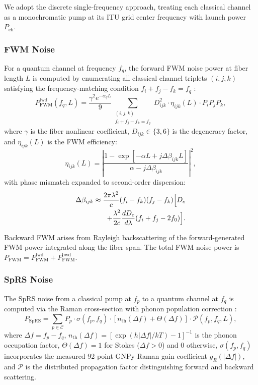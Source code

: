 \documentclass[conference]{IEEEtran}
\begin{document}
We adopt the discrete single-frequency approach, treating each classical channel as a monochromatic pump at its ITU grid center frequency with launch power $P_{\text{ch}}$.

\subsubsection{FWM Noise}

For a quantum channel at frequency $f_q$, the forward FWM noise power at fiber length $L$ is computed by enumerating all classical channel triplets $(i, j, k)$ satisfying the frequency-matching condition $f_i + f_j - f_k = f_q$ \cite{b8}:
\begin{equation}
P_{\text{FWM}}^{\text{fwd}}(f_q, L) = \frac{\gamma^2 e^{-\alpha_q L}}{9} \sum_{\substack{(i,j,k) \\ f_i+f_j-f_k=f_q}} D_{ijk}^2 \cdot \eta_{ijk}(L) \cdot P_i P_j P_k,
\label{eq:fwm}
\end{equation}
where $\gamma$ is the fiber nonlinear coefficient, $D_{ijk} \in \{3, 6\}$ is the degeneracy factor, and $\eta_{ijk}(L)$ is the FWM efficiency:
\begin{equation}
\eta_{ijk}(L) = \left|\frac{1 - \exp[-\alpha L + j\Delta\beta_{ijk} L]}{\alpha - j\Delta\beta_{ijk}}\right|^2,
\label{eq:eta}
\end{equation}
with phase mismatch expanded to second-order dispersion:
\begin{equation}
\begin{split}
\Delta\beta_{ijk} \approx \frac{2\pi\lambda^2}{c} (f_i - f_k)(f_j - f_k) \Bigl[D_c \\
+ \frac{\lambda^2}{2c} \frac{dD_c}{d\lambda}(f_i + f_j - 2f_0)\Bigr].
\end{split}
\label{eq:delta_beta}
\end{equation}

Backward FWM arises from Rayleigh backscattering of the forward-generated FWM power integrated along the fiber span. The total FWM noise power is $P_{\text{FWM}} = P_{\text{FWM}}^{\text{fwd}} + P_{\text{FWM}}^{\text{bwd}}$.

\subsubsection{SpRS Noise}

The SpRS noise from a classical pump at $f_p$ to a quantum channel at $f_q$ is computed via the Raman cross-section with phonon population correction \cite{b9}:
\begin{equation}
P_{\text{SpRS}} = \sum_{p \in \mathcal{C}} P_p \cdot \sigma(f_p, f_q) \cdot [n_{\text{th}}(\Delta f) + \Theta(\Delta f)] \cdot \mathcal{P}(f_p, f_q, L),
\label{eq:sprs}
\end{equation}
where $\Delta f = f_p - f_q$, $n_{\text{th}}(\Delta f) = [\exp(h|\Delta f|/kT) - 1]^{-1}$ is the phonon occupation factor, $\Theta(\Delta f) = 1$ for Stokes ($\Delta f > 0$) and $0$ otherwise, $\sigma(f_p, f_q)$ incorporates the measured 92-point GNPy Raman gain coefficient $g_R(|\Delta f|)$, and $\mathcal{P}$ is the distributed propagation factor distinguishing forward and backward scattering.
\end{document}
